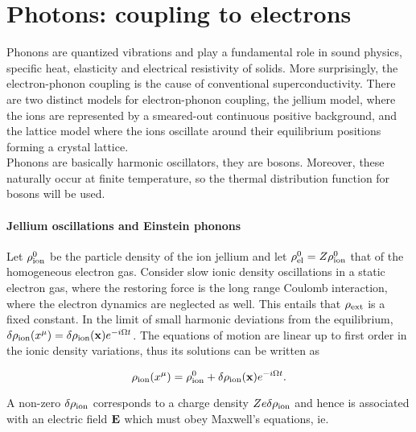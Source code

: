 \documentclass{homework}
\begin{document}
\clearpage

\section{Photons: coupling to electrons}

Phonons are quantized vibrations and play a fundamental role in sound physics, specific heat, elasticity and electrical resistivity of solids. More surprisingly, the electron-phonon coupling is the cause of conventional superconductivity. There are two distinct models for electron-phonon coupling, the jellium model, where the ions are represented by a smeared-out continuous positive background, and the lattice model where the ions oscillate around their equilibrium positions forming a crystal lattice. \\

Phonons are basically harmonic oscillators, they are bosons. Moreover, these naturally occur at finite temperature, so the thermal distribution function for bosons will be used. \\

\paragraph{\textbf{Jellium oscillations and Einstein phonons}}

Let $\rho^0_{\textnormal{ion}}$ be the particle density of the ion jellium and let $\rho^0_{\textnormal{el}} = Z \rho^0_{\textnormal{ion}}$ that of the homogeneous electron gas. Consider slow ionic density oscillations in a static electron gas, where the restoring force is the long range Coulomb interaction, where the electron dynamics are neglected as well. This entails that $\rho_{\textnormal{ext}}$ is a fixed constant. In the limit of small harmonic deviations from the equilibrium, $\delta \rho_{\textnormal{ion}}(x^\mu) = \delta \rho_{\textnormal{ion}} ({\bf x}) e^{-i\Omega t}$. The equations of motion are linear up to first order in the ionic density variations, thus its solutions can be written as 

\begin{equation}
    \rho_{\textnormal{ion}}(x^\mu) = \rho^0_{\textnormal{ion}} + \delta \rho_{\textnormal{ion}} ({\bf x}) e^{-i\Omega t}.
\end{equation}

A non-zero $\delta \rho_{\textnormal{ion}}$ corresponds to a charge density $Z e \delta \rho_{\textnormal{ion}}$ and hence is associated with an electric field ${\bf E}$ which must obey Maxwell's equations, ie.
\end{document}
